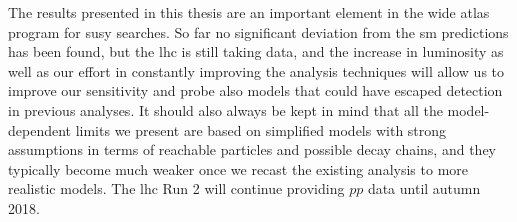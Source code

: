 The results presented in this thesis are an important element in the wide \gls{atlas} program 
for \gls{susy} searches. 
So far no significant deviation from the \gls{sm} predictions has been found,
but the \gls{lhc} is still taking data, and the increase in luminosity
as well as our effort in constantly improving the analysis techniques 
will allow us to improve our sensitivity and probe also models that could have 
escaped detection in previous analyses. 
It should also always be kept in mind that all the model-dependent limits we present are 
based on simplified models with strong assumptions in terms of reachable particles and 
possible decay chains, and they typically become much weaker once we recast the existing analysis 
to more realistic models. 
The \gls{lhc} Run 2 will continue providing $pp$ data until autumn 2018. 




